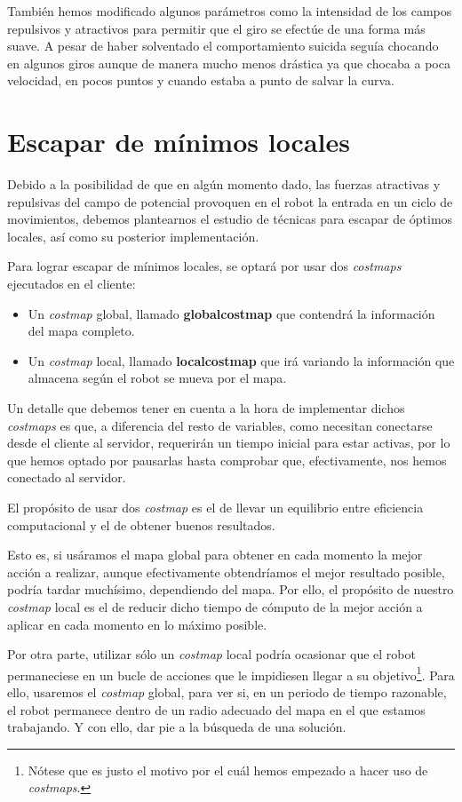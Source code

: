 \documentclass[a4paper, 11pt]{article}
\begin{document}
	También hemos modificado algunos parámetros como la intensidad de los campos repulsivos y atractivos
	para permitir que el giro se efectúe de una forma más suave. A pesar de haber solventado el
	comportamiento suicida seguía chocando en algunos giros aunque de manera mucho menos drástica ya
	que chocaba a poca velocidad, en pocos puntos y cuando estaba a punto de salvar la curva.

\section{Escapar de mínimos locales}
	Debido a la posibilidad de que en algún momento dado, las fuerzas atractivas y repulsivas del campo
	de potencial provoquen en el robot la entrada en un ciclo de movimientos, debemos plantearnos el
	estudio de técnicas para escapar de óptimos locales, así como su posterior implementación.
	
	Para lograr escapar de mínimos locales, se optará por usar dos \textit{costmaps} ejecutados en el
	cliente:
	
	\begin{itemize}
		\item Un \textit{costmap} global, llamado \textbf{globalcostmap} que contendrá la información
		del mapa completo.
		\item Un \textit{costmap} local, llamado \textbf{localcostmap} que irá variando la información
		que almacena según el robot se mueva por el mapa.
	\end{itemize}
	
	Un detalle que debemos tener en cuenta a la hora de implementar dichos \textit{costmaps} es que,
	a diferencia del resto de variables, como necesitan conectarse desde el cliente al servidor, requerirán
	un tiempo inicial para estar activas, por lo que hemos optado por pausarlas hasta comprobar que,
	efectivamente, nos hemos conectado al servidor.

	El propósito de usar dos \textit{costmap} es el de llevar un equilibrio entre eficiencia computacional
	y el de obtener buenos resultados.
	
	Esto es, si usáramos el mapa global para obtener en cada momento la mejor acción a realizar, aunque
	efectivamente obtendríamos el mejor resultado posible, podría tardar muchísimo, dependiendo del mapa.
	Por ello, el propósito de nuestro \textit{costmap} local es el de reducir dicho tiempo de cómputo de
	la mejor acción a aplicar en cada momento en lo máximo posible.
	
	Por otra parte, utilizar sólo un \textit{costmap} local podría ocasionar que el robot permaneciese en
	un bucle de acciones que le impidiesen llegar a su objetivo\footnote{Nótese que es justo el motivo
	por el cuál hemos empezado a hacer uso de \textit{costmaps}.}. Para ello, usaremos el \textit{costmap}
	global, para ver si, en un periodo de tiempo razonable, el robot permanece dentro de un radio adecuado
	del mapa en el que estamos trabajando. Y con ello, dar pie a la búsqueda de una solución.
		
\end{document}
